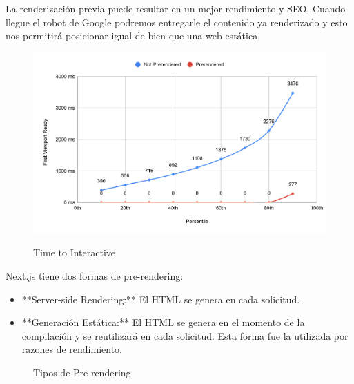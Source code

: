 \documentclass[12pt,twoside,titlepage]{report}
\begin{document}
\begin{itemize}
       La renderización previa puede resultar en un mejor rendimiento y SEO. Cuando llegue el robot de Google podremos entregarle el contenido ya renderizado y esto nos permitirá posicionar igual de bien que una web estática.

    \begin{figure}[H]
        \centering
        \includegraphics[scale=0.16]{nextjs_prerenderinggraph}
        \label{fig:nextjs_prerenderinggraph}
        \caption{Time to Interactive}
    \end{figure}
    

    Next.js tiene dos formas de pre-rendering:
    \begin{itemize}
        \item **Server-side Rendering:** El HTML se genera en cada solicitud.
        \item **Generación Estática:** El HTML se genera en el momento de la compilación y se reutilizará en cada solicitud. Esta forma fue la utilizada por razones de rendimiento.
    \end{itemize}
    \begin{figure}[H]
        \centering
        \caption{Tipos de Pre-rendering}
        \label{f:TiposPrerendering}
       \end{figure}


\end{itemize}
\end{document}
